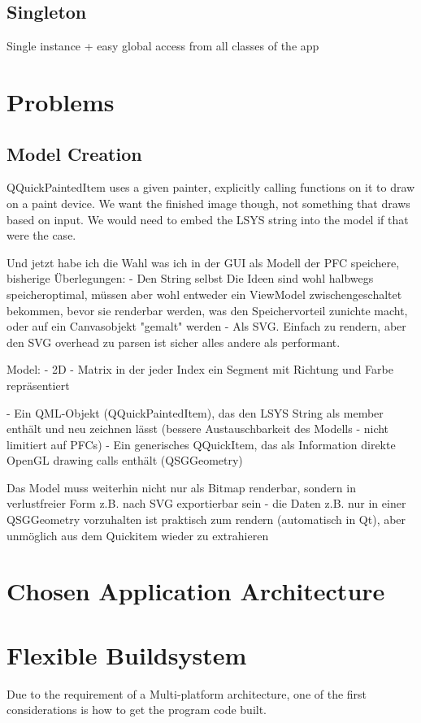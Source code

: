 \subsection{Singleton}
Single instance + easy global access from all classes of the app


\section{Problems}
\subsection{Model Creation}
QQuickPaintedItem uses a given painter, explicitly calling functions on it to draw on a paint device.
We want the finished image though, not something that draws based on input. We would need to embed the LSYS string into the model if that were the case.

Und jetzt habe ich die Wahl was ich in der GUI als Modell der PFC speichere, bisherige Überlegungen:
- Den String selbst
Die Ideen sind wohl halbwegs speicheroptimal, müssen aber wohl entweder ein ViewModel zwischengeschaltet bekommen, bevor sie renderbar werden, was den Speichervorteil zunichte macht, oder auf ein Canvasobjekt "gemalt" werden
- Als SVG. Einfach zu rendern, aber den SVG overhead zu parsen ist sicher alles andere als performant.

Model: - 2D - Matrix in der jeder Index ein Segment mit Richtung und Farbe repräsentiert

- Ein QML-Objekt (QQuickPaintedItem), das den LSYS String als member enthält und neu zeichnen lässt (bessere Austauschbarkeit des Modells - nicht limitiert auf PFCs)
- Ein generisches QQuickItem, das als Information direkte OpenGL drawing calls enthält (QSGGeometry)

Das Model muss weiterhin nicht nur als Bitmap renderbar, sondern in verlustfreier Form z.B. nach SVG exportierbar sein - die Daten z.B. nur in einer QSGGeometry vorzuhalten ist praktisch zum rendern (automatisch in Qt), aber unmöglich aus dem Quickitem wieder zu extrahieren


\section{Chosen Application Architecture}




\section{Flexible Buildsystem}
Due to the requirement of a Multi-platform architecture, one of the first considerations is how to get the program code built.

